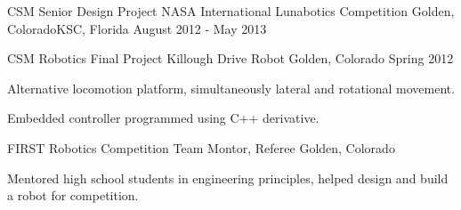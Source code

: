 

\begin{cventries}

  \cventry
    {CSM Senior Design Project} %
    {NASA International Lunabotics Competition} %
    {Golden, Colorado{\enskip\cdotp\enskip}KSC, Florida} %
    {August 2012 - May 2013} %
    {
      \begin{cvitems} %
        \item {}
      \end{cvitems}
    }

  \cventry
    {CSM Robotics Final Project} %
    {Killough Drive Robot} %
    {Golden, Colorado} %
    {Spring 2012} %
    {
      \begin{cvitems} %
        \item {Alternative locomotion platform, simultaneously lateral and rotational movement.}
        \item {Embedded controller programmed using C++ derivative.}
      \end{cvitems}
    }

  \cventry
    {FIRST Robotics Competition} %
    {Team Montor, Referee} %
    {Golden, Colorado} %
    {} %
    {
      \begin{cvitems} %
        \item {Mentored high school students in engineering principles, helped design and build a robot for competition.}
      \end{cvitems}
    }

\end{cventries}
